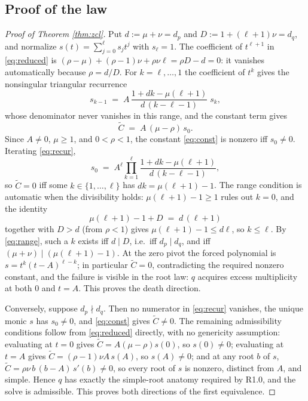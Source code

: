 \documentclass[11pt]{article}
\theoremstyle{definition}
\theoremstyle{remark}
\begin{document}
\subsection{Proof of the law}

\begin{proof}[Proof of Theorem \ref{thm:zcl}]
Put $d:=\mu+\nu=d_p$ and $D:=1+(\ell+1)\nu=d_q$, and normalize $s(t)=\sum_{j=0}^{\ell}s_jt^j$ with $s_\ell=1$. The coefficient of $t^{\ell+1}$ in \eqref{eq:reduced} is $(\rho-\mu)+(\rho-1)\nu+\rho\nu\ell=\rho D-d=0$: it vanishes automatically because $\rho=d/D$. For $k=\ell,\dots,1$ the coefficient of $t^k$ gives the nonsingular triangular recurrence
\begin{equation}\label{eq:recur}
s_{k-1}\;=\;A\,\frac{1+dk-\mu(\ell+1)}{d\,(k-\ell-1)}\;s_k ,
\end{equation}
whose denominator never vanishes in this range, and the constant term gives
\begin{equation}\label{eq:const}
\widetilde C\;=\;A\,(\mu-\rho)\,s_0 .
\end{equation}
Since $A\neq0$, $\mu\geq1$, and $0<\rho<1$, the constant \eqref{eq:const} is nonzero iff $s_0\neq0$. Iterating \eqref{eq:recur},
\[
s_0\;=\;A^{\ell}\prod_{k=1}^{\ell}\frac{1+dk-\mu(\ell+1)}{d\,(k-\ell-1)} ,
\]
so $\widetilde C=0$ iff some $k\in\{1,\dots,\ell\}$ has $dk=\mu(\ell+1)-1$. The range condition is automatic when the divisibility holds: $\mu(\ell+1)-1\geq1$ rules out $k=0$, and the identity
\begin{equation}\label{eq:range}
\mu(\ell+1)-1+D\;=\;d\,(\ell+1)
\end{equation}
together with $D>d$ (from $\rho<1$) gives $\mu(\ell+1)-1\leq d\ell$, so $k\leq\ell$. By \eqref{eq:range}, such a $k$ exists iff $d\mid D$, i.e.\ iff $d_p\mid d_q$, and iff $(\mu+\nu)\mid(\mu(\ell+1)-1)$. At the zero pivot the forced polynomial is $s=t^{k}(t-A)^{\ell-k}$; in particular $\widetilde C=0$, contradicting the required nonzero constant, and the failure is visible in the root law: $q$ acquires excess multiplicity at both $0$ and $t=A$. This proves the death direction.

Conversely, suppose $d_p\nmid d_q$. Then no numerator in \eqref{eq:recur} vanishes, the unique monic $s$ has $s_0\neq0$, and \eqref{eq:const} gives $\widetilde C\neq0$. The remaining admissibility conditions follow from \eqref{eq:reduced} directly, with no genericity assumption: evaluating at $t=0$ gives $\widetilde C=A(\mu-\rho)s(0)$, so $s(0)\neq0$; evaluating at $t=A$ gives $\widetilde C=(\rho-1)\nu A\,s(A)$, so $s(A)\neq0$; and at any root $b$ of $s$, $\widetilde C=\rho\nu\,b\,(b-A)\,s'(b)\neq0$, so every root of $s$ is nonzero, distinct from $A$, and simple. Hence $q$ has exactly the simple-root anatomy required by R1.0, and the solve is admissible. This proves both directions of the first equivalence.


\end{proof}
\end{document}
